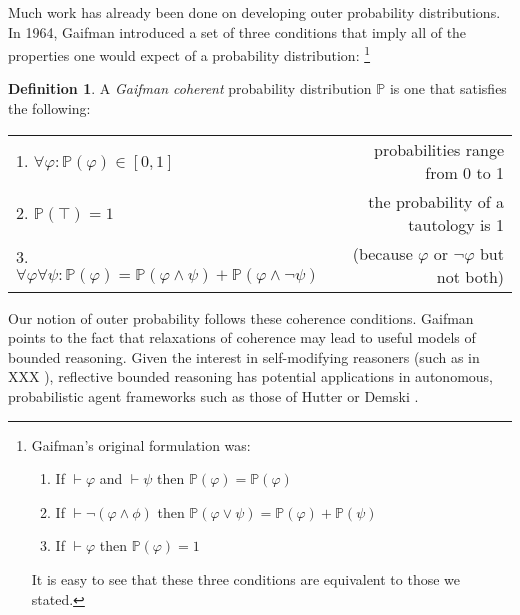 \documentclass[12pt]{article}
\newcommand{\PP}{\mathbb{P}}
\newcommand{\vp}{\varphi}
\theoremstyle{plain}
\theoremstyle{definition}
\newtheorem{definition}[theorem]{Definition}
\theoremstyle{remark}
\begin{document}
Much work has already been done on developing outer probability distributions. In 1964, Gaifman\cite{gaifman64} introduced a set of three conditions that imply all of the properties one would expect of a probability distribution:
\footnote{Gaifman's original formulation was:
\begin{enumerate}
\item If $\vdash \vp$ and $\vdash \psi$ then $\PP(\vp)=\PP(\vp)$
\item If $\vdash \neg (\vp \wedge \phi)$ then $\PP(\vp \vee \psi) = \PP(\vp) + \PP(\psi)$
\item If $\vdash \vp$ then $\PP(\vp) = 1$
\end{enumerate}
It is easy to see that these three conditions are equivalent to those we stated.
}
\begin{definition} A \emph{Gaifman coherent} probability distribution $\PP$ is one that satisfies the following:
\begin{center}
\begin{tabular}{l r}
1. $\forall \vp: \PP(\vp) \in [0,1]$ & probabilities range from 0 to 1 \\
2. $\PP(\top) = 1$ & the probability of a tautology is 1 \\
3. $\forall \vp \forall \psi: \PP(\vp) = \PP(\vp \wedge \psi) + \PP(\vp \wedge \neg \psi)$ & (because $\vp$ or $\neg \vp$ but not both)
\end{tabular}
\end{center}
\end{definition}

% 


Our notion of outer probability follows these coherence conditions. Gaifman\cite{gaifman04} points to the fact that relaxations of coherence may lead to useful models of bounded reasoning. Given the interest in self-modifying reasoners (such as in XXX%
), reflective bounded reasoning has potential applications in autonomous, probabilistic agent frameworks such as those of
Hutter or Demski
\cite{hutter13,demski12}.
\end{document}
